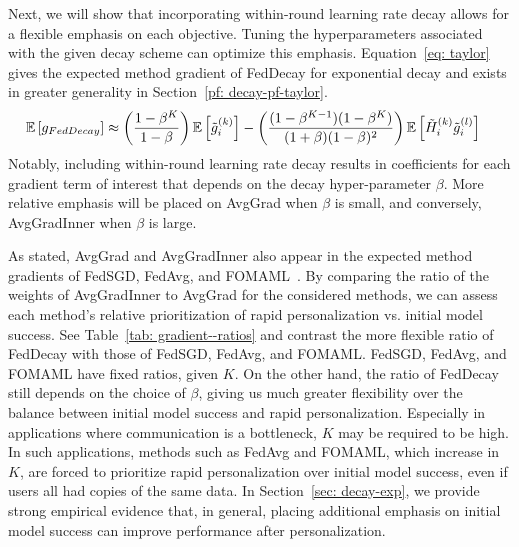 Next, we will show that incorporating within-round learning rate decay allows for a flexible emphasis on each objective. Tuning the hyperparameters associated with the given decay scheme can optimize this emphasis. 
Equation~\ref{eq: taylor} gives the expected method gradient of FedDecay for exponential decay and exists in greater generality in Section~\ref{pf: decay-pf-taylor}.
\begin{align}
\mathbb{E} \left[g_{FedDecay} \right] & \approx \left( \dfrac{1 - \beta^K}{1 - \beta} \right) \mathbb{E} \left[ \Tilde{g}_i^{(k)} \right] - \left( \dfrac{(1 - \beta^{K - 1})(1 - \beta^K)}{(1 + \beta)(1 - \beta)^2} \right) \mathbb{E} \left[ \Tilde{H}_i^{(k)} \Tilde{g}_i^{(l)} \right] \label{eq: taylor} 
\end{align}
Notably, including within-round learning rate decay results in coefficients for each gradient term of interest that depends on the decay hyper-parameter $\beta$.
More relative emphasis will be placed on AvgGrad when $\beta$ is small, and conversely, AvgGradInner when $\beta$ is large.

As stated, AvgGrad and AvgGradInner also appear in the expected method gradients of FedSGD, FedAvg, and FOMAML~\citep{reptile}.
By comparing the ratio of the weights of AvgGradInner to AvgGrad for the considered methods, we can assess each method's relative prioritization of rapid personalization vs. initial model success. 
See Table~\ref{tab: gradient--ratios} and contrast the more flexible ratio of FedDecay with those of FedSGD, FedAvg, and FOMAML.
FedSGD, FedAvg, and FOMAML have fixed ratios, given $K$.
On the other hand, the ratio of FedDecay still depends on the choice of $\beta$, giving us much greater flexibility over the balance between initial model success and rapid personalization. 
Especially in applications where communication is a bottleneck, $K$ may be required to be high.
In such applications, methods such as FedAvg and FOMAML, which increase in $K$, are forced to prioritize rapid personalization over initial model success, even if users all had copies of the same data.
In Section~\ref{sec: decay-exp}, we provide strong empirical evidence that, in general, placing additional emphasis on initial model success can improve performance after personalization.


